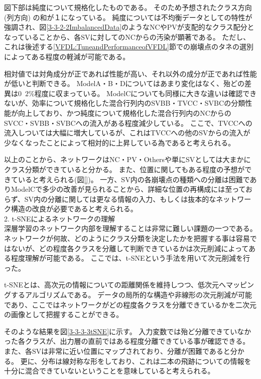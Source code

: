 図下部は純度について規格化したものである。
そのため予想されたクラス方向 (列方向) の和が１になっている。
純度については不均衡データとしての特性が強調され、図\ref{3-3-2-2ImbalancedData}のようなNCやPVが支配的なクラス配分となっていることから、各SVに対してのNCからの汚染が顕著である。
ただし、これは後述する\ref{VFDL:TuneandPerformanceofVFDL}節での崩壊点のタネの選別によってある程度の軽減が可能である。

相対値では対角成分が正であれば性能が高い、それ以外の成分が正であれば性能が低いと判断できる。
ModelA・B・Dについてはあまり変化はなく、殆どの差異は$0$~$2$\%程度に収まっている。
ModelCについても同様に大きな違いは確認できないが、効率について規格化した混合行列内のSVBB・TVCC・SVBCの分類性能が向上しており、かつ純度について規格化した混合行列内のNCからのSVCC・SVBB・SVBCへの流入がある程度減少している。
ここで、TVCCへの流入しついては大幅に増大しているが、これはTVCCへの他のSVからの流入が少なくなったことによって相対的に上昇している為であると考えられる。

以上のことから、ネットワークはNC・PV・Othersや単にSVとしては大まかにクラス分類ができていると分かる。
また、位置に関してもある程度の予想ができていると考えられる(図\ref{})。
一方、SV内の各崩壊点の種類への分離は困難でありModelCで多少の改善が見られることから、詳細な位置の再構成には至っておらず、SV内の分離に関しては更なる情報の入力、もしくは抜本的なネットワーク構造の改良が必要であると考えられる。\\

2. t-SNEによるネットワークの理解\\

深層学習のネットワーク内部を理解することは非常に難しい課題の一つである。
ネットワークが何故、どのようにクラス分類を決定したかを把握する事は容易ではないが、どの程度各クラスを分離して判断できているかは次元削減によってある程度理解が可能である。
ここでは、t-SNEという手法を用いて次元削減を行った。

t-SNEとは、高次元の情報についての距離関係を維持しつつ、低次元へマッピングするアルゴリズムである。
データの局所的な構造や非線形の次元削減が可能であり、ここではネットワークがどの程度各クラスを分離できているかを二次元の画像として把握することができる。

そのような結果を図\ref{3-3-3-3tSNE}に示す。
入力変数では殆ど分離できていなかった各クラスが、出力層の直前ではある程度分離できている事が確認できる。
また、各SVは非常に近い位置にマップされており、分離が困難であると分かる。
更に、分布は線対称な形をしており、これは二本の飛跡についての情報を十分に混合できていないということを意味していると考えられる。

